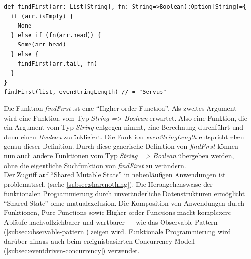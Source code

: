 \begin{lstlisting}[caption={Rekursive Funktion zur Suche des ersten passenden Elements.},label={lst:lst4}]
def findFirst(arr: List[String], fn: String=>Boolean):Option[String]={
  if (arr.isEmpty) {
    None
  } else if (fn(arr.head)) {
    Some(arr.head)
  } else {
    findFirst(arr.tail, fn)
  }
}
findFirst(list, evenStringLength) // = "Servus"
\end{lstlisting}

Die Funktion \textit{findFirst} ist eine \enquote{Higher-order Function}. Als zweites Argument wird eine Funktion vom Typ \textit{String => Boolean} erwartet. Also eine Funktion, die ein Argument vom Typ \textit{String} entgegen nimmt, eine Berechnung durchführt und dann einen \textit{Boolean} zurückliefert. Die Funktion \textit{evenStringLength} entspricht eben genau dieser Definition. Durch diese generische Definition von \textit{findFirst} können nun auch andere Funktionen vom Typ \textit{String => Boolean} übergeben werden, ohne die eigentliche Suchfunktion von \textit{findFirst} zu verändern.\\

Der Zugriff auf \enquote{Shared Mutable State} in nebenläufigen Anwendungen ist problematisch (siehe \ref{subsec:sharenothing}). Die Herangehensweise der funktionalen Programmierung durch unveränderliche Datenstrukturen ermöglicht \enquote{Shared State} ohne \gls{mutualexclusion}. Die Komposition von Anwendungen durch Funktionen, Pure Functions sowie Higher-order Functions macht komplexere Abläufe nachvollziehbarer und wartbarer --- wie das Observable Pattern (\ref{subsec:observable-pattern}) zeigen wird. Funktionale Programmierung wird darüber hinaus auch beim ereignisbasierten Concurrency Modell (\ref{subsec:eventdriven-concurrency}) verwendet.
